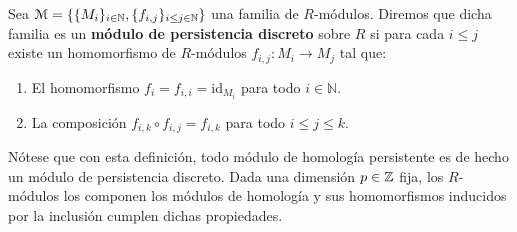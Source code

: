 \begin{definicion}
	Sea \( \mathcal{M} = \{\{M_i\}_{i \in \mathbb{N}}, \{f_{i,j}\}_{i \leq j \in \mathbb{N}}\} \) una familia de \( R \)-módulos. Diremos que dicha familia es un \textbf{módulo de persistencia discreto} sobre \( R \) si para cada \( i \leq j \) existe un homomorfismo de \( R \)-módulos \( f_{i,j}: M_i \to M_j \) tal que:
	\begin{enumerate}
		\item El homomorfismo \( f_i = f_{i,i} = \mathrm{id}_{M_i} \) para todo \( i \in \mathbb{N} \).
		\item La composición \( f_{i,k} \circ f_{i,j} = f_{i,k} \) para todo \( i \leq j \leq k \).
	\end{enumerate}
\end{definicion}
\begin{observacion}
	Nótese que con esta definición, todo módulo de homología persistente es de hecho un módulo de persistencia discreto. Dada una dimensión $p \in \mathbb{Z}$ fija, los $R$-módulos los componen los módulos de homología y sus homomorfismos inducidos por la inclusión cumplen dichas propiedades. 
\end{observacion}

